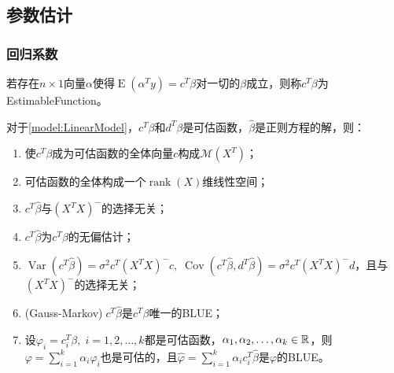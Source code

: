 \subsection{参数估计}
\subsubsection{回归系数}
\begin{definition}
	若存在$n\times 1$向量$\alpha$使得$\operatorname{E}(\alpha^Ty)=c^T\beta$对一切的$\beta$成立，则称$c^T\beta$为\gls{EstimableFunction}。
\end{definition}
\begin{property}\label{prop:EstimableFunction}
	对于\cref{model:LinearModel}，$c^T\beta$和$d^T\beta$是可估函数，$\hat{\beta}$是正则方程的解，则：
	\begin{enumerate}
		\item 使$c^T\beta$成为可估函数的全体向量$c$构成$\mathcal{M}(X^T)$；
		\item 可估函数的全体构成一个$\operatorname{rank}(X)$维线性空间；
		\item $c^T\hat{\beta}$与$(X^TX)^-$的选择无关；
		\item $c^T\hat{\beta}$为$c^T\beta$的无偏估计；
		\item  $\operatorname{Var}(c^T\hat{\beta})=\sigma^2c^T(X^TX)^-c,\;\operatorname{Cov}(c^T\hat{\beta},d^T\hat{\beta})=\sigma^2c^T(X^TX)^-d$，且与$(X^TX)^-$的选择无关；
		\item (Gauss-Markov)$\;c^T\hat{\beta}$是$c^T\beta$唯一的BLUE；
		\item 设$\varphi_i=c_i^T\beta,\;i=1,2,\dots,k$都是可估函数，$\alpha_1, \alpha_2, \dots, \alpha_{k}\in\mathbb{R}^{}$，则$\varphi=\sum\limits_{i=1}^{k}\alpha_i\varphi_i$也是可估的，且$\hat{\varphi}=\sum\limits_{i=1}^{k}\alpha_ic_i^T\hat{\beta}$是$\varphi$的BLUE。
	\end{enumerate}
\end{property}
